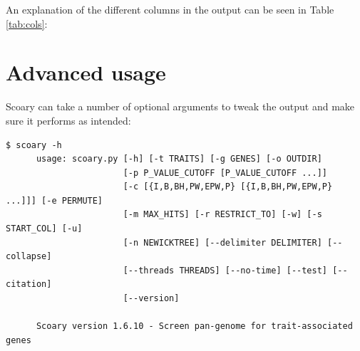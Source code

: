 \documentclass{article}
\begin{document}
      An explanation of the different columns in the output can be seen in Table \ref{tab:cols}: \\
      

  \section{Advanced usage}
    Scoary can take a number of optional arguments to tweak the output and make sure it performs as intended:
    \begin{lstlisting}[basicstyle=\fontsize{6}{11}\ttfamily,breaklines]
      $ scoary -h
      usage: scoary.py [-h] [-t TRAITS] [-g GENES] [-o OUTDIR]
                       [-p P_VALUE_CUTOFF [P_VALUE_CUTOFF ...]]
                       [-c [{I,B,BH,PW,EPW,P} [{I,B,BH,PW,EPW,P} ...]]] [-e PERMUTE]
                       [-m MAX_HITS] [-r RESTRICT_TO] [-w] [-s START_COL] [-u]
                       [-n NEWICKTREE] [--delimiter DELIMITER] [--collapse]
                       [--threads THREADS] [--no-time] [--test] [--citation]
                       [--version]

      Scoary version 1.6.10 - Screen pan-genome for trait-associated genes


\end{lstlisting}
\end{document}
